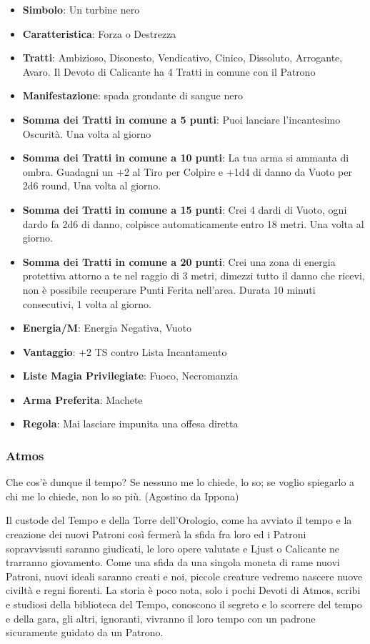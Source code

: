 \begin{multicols}{2}
\begin{itemize}[leftmargin=*] \setlength{\itemsep}{0pt}
\item \textbf{Simbolo}: Un turbine nero
\item \textbf{Caratteristica}: Forza o Destrezza
\item \textbf{Tratti}: Ambizioso, Disonesto, Vendicativo, Cinico, Dissoluto, Arrogante, Avaro. Il Devoto di Calicante ha 4 Tratti in comune con il Patrono
\item \textbf{Manifestazione}: spada grondante di sangue nero
\item \textbf{Somma dei Tratti in comune a 5 punti}: Puoi lanciare l'incantesimo Oscurità. Una volta al giorno
\item \textbf{Somma dei Tratti in comune a 10 punti}: La tua arma si ammanta di ombra. Guadagni un +2 al Tiro per Colpire e +1d4 di danno da Vuoto per 2d6 round, Una volta al giorno.
\item \textbf{Somma dei Tratti in comune a 15 punti}: Crei 4 dardi di Vuoto, ogni dardo fa 2d6 di danno, colpisce automaticamente entro 18 metri. Una volta al giorno.
\item \textbf{Somma dei Tratti in comune a 20 punti}: Crei una zona di energia protettiva attorno a te nel raggio di 3 metri, dimezzi tutto il danno che ricevi, non è possibile recuperare Punti Ferita nell'area. Durata 10 minuti consecutivi, 1 volta al giorno.
\item \textbf{Energia/M}: Energia Negativa, Vuoto
\item \textbf{Vantaggio}: +2 TS contro Lista Incantamento
\item \textbf{Liste Magia Privilegiate}: Fuoco, Necromanzia
\item \textbf{Arma Preferita}: Machete
\item \textbf{Regola}: Mai lasciare impunita una offesa diretta
\end{itemize}

\subsubsection{Atmos}\label{atmos}\hypertarget{atmos}{}

\begin{enfasi}{
Che cos'è dunque il tempo? Se nessuno me lo chiede, lo so; se voglio spiegarlo a chi me lo chiede, non lo so più. (Agostino da Ippona)
}\end{enfasi}

Il custode del Tempo e della Torre dell'Orologio, come ha avviato il tempo e la creazione dei nuovi Patroni così fermerà la sfida fra loro ed i Patroni sopravvissuti saranno giudicati, le loro opere valutate e Ljust o Calicante ne trarranno giovamento. Come una sfida da una singola moneta di rame nuovi Patroni, nuovi ideali saranno creati e noi, piccole creature vedremo nascere nuove civiltà e regni fiorenti. La storia è poco nota, solo i pochi Devoti di Atmos, scribi e studiosi della biblioteca del Tempo, conoscono il segreto e lo scorrere del tempo e della gara, gli altri, ignoranti, vivranno il loro tempo con un padrone sicuramente guidato da un Patrono.


\end{multicols}
